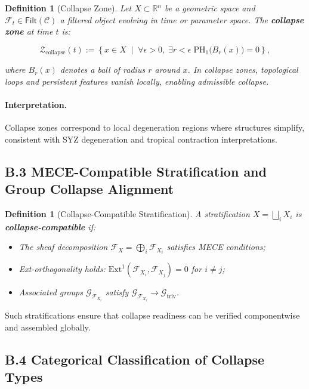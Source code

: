 \documentclass[11pt]{article}
\newtheorem{definition}[theorem]{Definition}
\begin{document}
\begin{definition}[Collapse Zone]
Let \( X \subset \mathbb{R}^n \) be a geometric space and \( \mathcal{F}_t \in \mathsf{Filt}(\mathcal{C}) \) a filtered object evolving in time or parameter space. The \textbf{collapse zone} at time \( t \) is:

\[
\mathcal{Z}_{\mathrm{collapse}}(t) := \left\{ x \in X \;\middle|\; \forall \epsilon > 0, \; \exists r < \epsilon \; \mathrm{PH}_1\big(B_r(x)\big) = 0 \right\},
\]

where \( B_r(x) \) denotes a ball of radius \( r \) around \( x \). In collapse zones, topological loops and persistent features vanish locally, enabling admissible collapse.

\end{definition}

\paragraph{Interpretation.}
Collapse zones correspond to local degeneration regions where structures simplify, consistent with SYZ degeneration and tropical contraction interpretations.

\subsection*{B.3 MECE-Compatible Stratification and Group Collapse Alignment}

\begin{definition}[Collapse-Compatible Stratification]
A stratification \( X = \bigsqcup_i X_i \) is \textbf{collapse-compatible} if:

\begin{itemize}
    \item The sheaf decomposition \( \mathcal{F}_X = \bigoplus_i \mathcal{F}_{X_i} \) satisfies MECE conditions;
    \item Ext-orthogonality holds: \( \mathrm{Ext}^1(\mathcal{F}_{X_i}, \mathcal{F}_{X_j}) = 0 \) for \( i \neq j \);
    \item Associated groups \( \mathcal{G}_{\mathcal{F}_{X_i}} \) satisfy \( \mathcal{G}_{\mathcal{F}_{X_i}} \longrightarrow \mathcal{G}_{\mathrm{triv}} \).
\end{itemize}
\end{definition}

Such stratifications ensure that collapse readiness can be verified componentwise and assembled globally.

\subsection*{B.4 Categorical Classification of Collapse Types}
\end{document}
